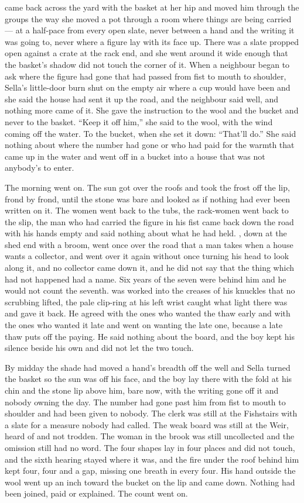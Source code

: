  came back across the yard with the basket at her hip and moved him through the groups the way she moved a pot through a room where things are being carried --- at a half-pace from every open slate, never between a hand and the writing it was going to, never where a figure lay with its face up. There was a slate propped open against a crate at the rack end, and she went around it wide enough that the basket's shadow did not touch the corner of it. When a neighbour began to ask where the figure had gone that had passed from fist to mouth to shoulder, Sella's little-door burn shut on the empty air where a cup would have been and she said the house had sent it up the road, and the neighbour said well, and nothing more came of it. She gave the instruction to the wool and the bucket and never to the basket. “Keep it off him,” she said to the wool, with the wind coming off the water. To the bucket, when she set it down: “That'll do.” She said nothing about where the number had gone or who had paid for the warmth that came up in the water and went off in a bucket into a house that was not anybody's to enter.

The morning went on. The sun got over the roofs and took the frost off the lip, frond by frond, until the stone was bare and looked as if nothing had ever been written on it. The women went back to the tubs, the rack-women went back to the slip, the man who had carried the figure in his fist came back down the road with his hands empty and said nothing about what he had held. , down at the shed end with a broom, went once over the road that a man takes when a house wants a collector, and went over it again without once turning his head to look along it, and no collector came down it, and he did not say that the thing which had not happened had a name. Six years of the seven were behind him and he would not count the seventh.  was worked into the creases of his knuckles that no scrubbing lifted, the pale clip-ring at his left wrist caught what light there was and gave it back. He agreed with the ones who wanted the thaw early and with the ones who wanted it late and went on wanting the late one, because a late thaw puts off the paying. He said nothing about the board, and the boy kept his silence beside his own and did not let the two touch.

By midday the shade had moved a hand's breadth off the well and Sella turned the basket so the sun was off his face, and the boy lay there with the fold at his chin and the stone lip above him, bare now, with the writing gone off it and nobody owning the day. The number had gone past him from fist to mouth to shoulder and had been given to nobody. The clerk was still at the Fishstairs with a slate for a measure nobody had called. The weak board was still at the Weir, heard of and not trodden. The woman in the brook was still uncollected and the omission still had no word. The four shapes lay in four places and did not touch, and the sixth hearing stayed where it was, and the fire under the roof behind him kept four, four and a gap, missing one breath in every four. His hand outside the wool went up an inch toward the bucket on the lip and came down. Nothing had been joined, paid or explained. The count went on.

